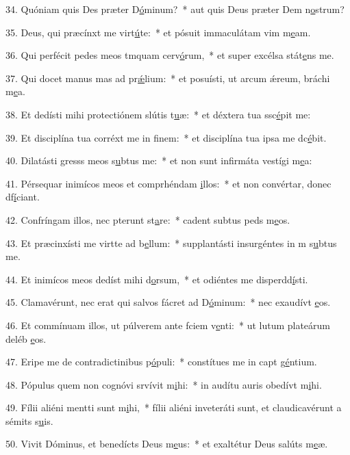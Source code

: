 34. Quóniam quis Des præter D\uline{ó}minum?~* aut quis Deus præter Dem n\uline{o}strum?\par 
35. Deus, qui præcínxt me virt\uline{ú}te:~* et pósuit immaculátam vim m\uline{e}am.\par 
36. Qui perfécit pedes meos tmquam cerv\uline{ó}rum,~* et super excélsa stát\uline{e}ns me.\par 
37. Qui docet manus mas ad pr\uline{ǽ}lium:~* et posuísti, ut arcum ǽreum, bráchi m\uline{e}a.\par 
38. Et dedísti mihi protectiónem slútis t\uline{u}æ:~* et déxtera tua ssc\uline{é}pit me:\par 
39. Et disciplína tua corréxt me in f\uline{i}nem:~* et disciplína tua ipsa me dc\uline{é}bit.\par 
40. Dilatásti gresss meos s\uline{u}btus me:~* et non sunt infirmáta vestígi m\uline{e}a:\par 
41. Pérsequar inimícos meos et comprhéndam \uline{i}llos:~* et non convértar, donec df\uline{í}ciant.\par 
42. Confríngam illos, nec pterunt st\uline{a}re:~* cadent subtus peds m\uline{e}os.\par 
43. Et præcinxísti me virtte ad b\uline{e}llum:~* supplantásti insurgéntes in m s\uline{u}btus me.\par 
44. Et inimícos meos dedíst mihi d\uline{o}rsum,~* et odiéntes me disperdd\uline{í}sti.\par 
45. Clamavérunt, nec erat qui salvos fácret ad D\uline{ó}minum:~* nec exaudívt \uline{e}os.\par 
46. Et commínuam illos, ut púlverem ante fciem v\uline{e}nti:~* ut lutum plateárum deléb \uline{e}os.\par 
47. Eripe me de contradictinibus p\uline{ó}puli:~* constítues me in capt g\uline{é}ntium.\par 
48. Pópulus quem non cognóvi srvívit m\uline{i}hi:~* in audítu auris obedívt m\uline{i}hi.\par 
49. Fílii aliéni mentti sunt m\uline{i}hi,~* fílii aliéni inveteráti sunt, et claudicavérunt a sémits s\uline{u}is.\par 
50. Vivit Dóminus, et benedícts Deus m\uline{e}us:~* et exaltétur Deus salúts m\uline{e}æ.\par 
